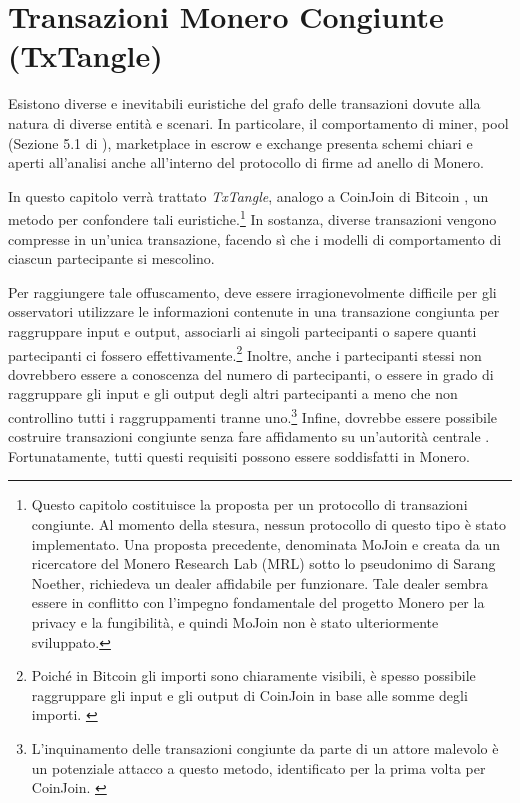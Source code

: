 \chapter{Transazioni Monero Congiunte (TxTangle)}
\label{chapter:txtangle}

Esistono diverse e inevitabili euristiche del grafo delle transazioni dovute alla natura di diverse entità e scenari. In particolare, il comportamento di miner, pool (Sezione 5.1 di \cite{AnalysisOfLinkability}), marketplace in escrow e exchange presenta schemi chiari e aperti all'analisi anche all'interno del protocollo di firme ad anello di Monero. 

In questo capitolo verrà trattato \emph{TxTangle}, analogo a CoinJoin di Bitcoin \cite{coinjoin-wiki}, un metodo per confondere tali euristiche.\footnote{Questo capitolo costituisce la proposta per un protocollo di transazioni congiunte. Al momento della stesura, nessun protocollo di questo tipo è stato implementato. Una proposta precedente, denominata MoJoin e creata da un ricercatore del Monero Research Lab (MRL) sotto lo pseudonimo di Sarang Noether, richiedeva un dealer affidabile per funzionare. Tale dealer sembra essere in conflitto con l'impegno fondamentale del progetto Monero per la privacy e la fungibilità, e quindi MoJoin non è stato ulteriormente sviluppato.} In sostanza, diverse transazioni vengono compresse in un'unica transazione, facendo sì che i modelli di comportamento di ciascun partecipante si mescolino. 

Per raggiungere tale offuscamento, deve essere irragionevolmente difficile per gli osservatori utilizzare le informazioni contenute in una transazione congiunta per raggruppare input e output, associarli ai singoli partecipanti o sapere quanti partecipanti ci fossero effettivamente.\footnote{Poiché in Bitcoin gli importi sono chiaramente visibili, è spesso possibile raggruppare gli input e gli output di CoinJoin in base alle somme degli importi. \cite{coinjoin-sudoku}} Inoltre, anche i partecipanti stessi non dovrebbero essere a conoscenza del numero di partecipanti, o essere in grado di raggruppare gli input e gli output degli altri partecipanti a meno che non controllino tutti i raggruppamenti tranne uno.\footnote{L'inquinamento delle transazioni congiunte da parte di un attore malevolo è un potenziale attacco a questo metodo, identificato per la prima volta per CoinJoin. \cite{coinjoin-pollution}} Infine, dovrebbe essere possibile costruire transazioni congiunte senza fare affidamento su un'autorità centrale \cite{exa-blockchain-analysis}. Fortunatamente, tutti questi requisiti possono essere soddisfatti in Monero.



